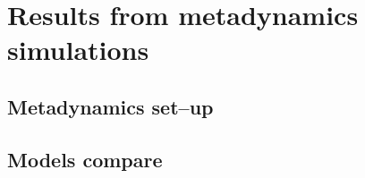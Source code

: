 \chapter{Results from metadynamics simulations}





\section{Metadynamics set--up}





\section{Models compare}

